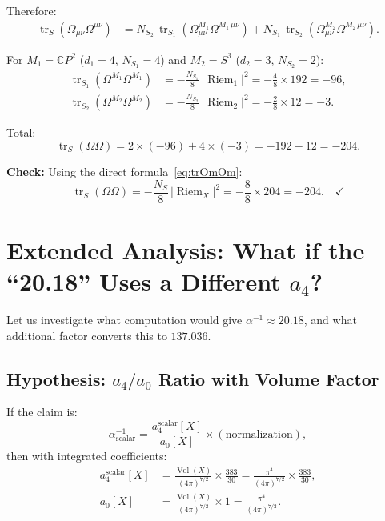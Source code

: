 \documentclass[12pt,a4paper]{article}
\theoremstyle{definition}
\DeclareMathOperator{\tr}{tr}
\DeclareMathOperator{\Riem}{Riem}
\DeclareMathOperator{\Vol}{Vol}
\begin{document}
Therefore:
\begin{align}
\tr_S(\Omega_{\mu\nu}\Omega^{\mu\nu})
  &= N_{S_2}\,\tr_{S_1}(\Omega^{M_1}_{\mu\nu}\Omega^{M_1\,\mu\nu})
  + N_{S_1}\,\tr_{S_2}(\Omega^{M_2}_{\mu\nu}\Omega^{M_2\,\mu\nu}).
\end{align}

For $M_1 = \mathbb{C}P^2$ ($d_1 = 4$, $N_{S_1} = 4$) and
$M_2 = S^3$ ($d_2 = 3$, $N_{S_2} = 2$):
\begin{align}
\tr_{S_1}(\Omega^{M_1}\Omega^{M_1})
  &= -\frac{N_{S_1}}{8}\,|\Riem_1|^2
  = -\frac{4}{8}\times 192 = -96, \\
\tr_{S_2}(\Omega^{M_2}\Omega^{M_2})
  &= -\frac{N_{S_2}}{8}\,|\Riem_2|^2
  = -\frac{2}{8}\times 12 = -3.
\end{align}

Total:
\begin{equation}
\tr_S(\Omega\Omega) = 2 \times (-96) + 4 \times (-3)
= -192 - 12 = -204.
\end{equation}

\textbf{Check:} Using the direct formula~\eqref{eq:trOmOm}:
\begin{equation}
\tr_S(\Omega\Omega) = -\frac{N_S}{8}\,|\Riem_X|^2
= -\frac{8}{8}\times 204 = -204. \quad\checkmark
\end{equation}


\section{Extended Analysis: What if the ``20.18'' Uses a Different $a_4$?}
\label{sec:extended}

Let us investigate what computation would give $\alpha^{-1} \approx
20.18$, and what additional factor converts this to $137.036$.

\subsection{Hypothesis: $a_4/a_0$ Ratio with Volume Factor}

If the claim is:
\begin{equation}
\alpha^{-1}_{\text{scalar}} = \frac{a_4^{\text{scalar}}[X]}{a_0[X]}
\times (\text{normalization}),
\end{equation}
then with integrated coefficients:
\begin{align}
a_4^{\text{scalar}}[X] &= \frac{\Vol(X)}{(4\pi)^{7/2}}
\times \frac{383}{30}
= \frac{\pi^4}{(4\pi)^{7/2}} \times \frac{383}{30}, \\
a_0[X] &= \frac{\Vol(X)}{(4\pi)^{7/2}} \times 1
= \frac{\pi^4}{(4\pi)^{7/2}}.
\end{align}
\end{document}
